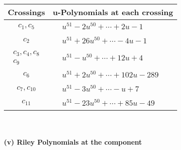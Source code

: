 \documentclass[1p]{elsarticle_modified}
\theoremstyle{definition}
\begin{document}
\begin{tabular}{m{50pt}|m{274pt}}
Crossings & \hspace{64pt}u-Polynomials at each crossing \\
\hline $$\begin{aligned}c_{1},c_{5}\end{aligned}$$&$\begin{aligned}
&u^{51}-2 u^{50}+\cdots+2 u-1
\end{aligned}$\\
\hline $$\begin{aligned}c_{2}\end{aligned}$$&$\begin{aligned}
&u^{51}+26 u^{50}+\cdots-4 u-1
\end{aligned}$\\
\hline $$\begin{aligned}c_{3},c_{4},c_{8}\\c_{9}\end{aligned}$$&$\begin{aligned}
&u^{51}- u^{50}+\cdots+12 u+4
\end{aligned}$\\
\hline $$\begin{aligned}c_{6}\end{aligned}$$&$\begin{aligned}
&u^{51}+2 u^{50}+\cdots+102 u-289
\end{aligned}$\\
\hline $$\begin{aligned}c_{7},c_{10}\end{aligned}$$&$\begin{aligned}
&u^{51}-3 u^{50}+\cdots- u+7
\end{aligned}$\\
\hline $$\begin{aligned}c_{11}\end{aligned}$$&$\begin{aligned}
&u^{51}-23 u^{50}+\cdots+85 u-49
\end{aligned}$\\
\hline
\end{tabular}\\~\\
\newpage\renewcommand{\arraystretch}{1}
\flushleft \textbf{(v) Riley Polynomials at the component}\newline \\
\end{document}
